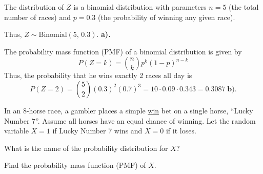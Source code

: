 \documentclass[a4paper, 10pt]{article}
\begin{document}
\begin{tosubmit}
	The distribution of \( Z \) is a binomial distribution with parameters \( n = 5 \) (the total number of races)
	and \( p = 0.3 \) (the probability of winning any given race).
	\par\noindent Thus, \( \boxed{Z \sim \text{Binomial}(5,\, 0.3)} \). \textbf{a).}

	\myspace

	\par\noindent The probability mass function (PMF) of a binomial distribution is given by
	\[
		P(Z = k) = \binom{n}{k} p^k (1-p)^{n-k}
	\]
	Thus, the probability that he wins exactly 2 races all day is
	\[
		P(Z = 2) = \binom{5}{2} (0.3)^2 (0.7)^3 = 10 \cdot 0.09 \cdot 0.343 = \boxed{0.3087} \; \textbf{b).}
	\]
\end{tosubmit}

\pagebreak

\begin{problem}
In an 8-horse race, a gambler places a simple \underline{win} bet on a single horse, ``Lucky Number 7''.
Assume all horses have an equal chance of winning.
Let the random variable \( X = 1 \) if Lucky Number 7 wins and \( X = 0 \) if it loses.
\begin{subproblems_alpha}
	\item What is the name of the probability distribution for \( X \)?
	\item Find the probability mass function (PMF) of \( X \).
\end{subproblems_alpha}
\end{problem}
\end{document}
